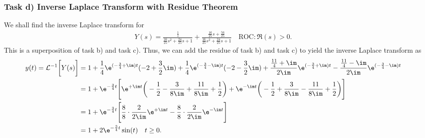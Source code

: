 \subsubsection{Task d) Inverse Laplace Transform with Residue Theorem}
We shall find the inverse Laplace transform for
\begin{align}
	Y(s) = \frac{\frac{1}{s}}{\frac{16}{25} s^2 + \frac{24}{25} s + 1}+
	\frac{\frac{16}{25} s + \frac{56}{25}}{\frac{16}{25} s^2 + \frac{24}{25} s + 1}
\quad \text{ROC}: \Re(s) > 0
	.
\end{align}
This is a superposition of task b) and task c). Thus, we can add the residue of task b) and task c) to yield the inverse Laplace transform as
\begin{align}
	y(t) = \mathcal{L}^{-1}\bigg [Y(s)\bigg] &= 1 + \frac{1}{4}\e^{(-\frac{3}{4}+\im)t}(-2+\frac{3}{2}\im) + \frac{1}{4}\e^{(-\frac{3}{4}-\im)t}(-2-\frac{3}{2}\im) + \frac{\frac{11}{4}+\im}{2\im}\e^{(-\frac{3}{4}+\im)t} - \frac{\frac{11}{4}-\im}{2\im}\e^{(-\frac{3}{4}-\im)t} \nonumber \\
	&= 1 + \e^{-\frac{3}{4}t}\Bigg [\e^{+\im t}\bigg (-\frac{1}{2}-\frac{3}{8\im} +\frac{11}{8\im}+\frac{1}{2}\bigg ) + \e^{-\im t} \bigg (-\frac{1}{2}+\frac{3}{8\im} -\frac{11}{8\im}+\frac{1}{2} \bigg ) \Bigg ] \nonumber \\
	&= 1 + \e^{-\frac{3}{4}t}\Bigg [\frac{8}{8}\cdot\frac{2}{2\im}\e^{+\im t}-\frac{8}{8}\cdot\frac{2}{2\im}\e^{-\im t} \Bigg ] \nonumber \\
	&= 1 + 2\e^{-\frac{3}{4}t}\sin(t) \quad t \geq 0.
\end{align}

